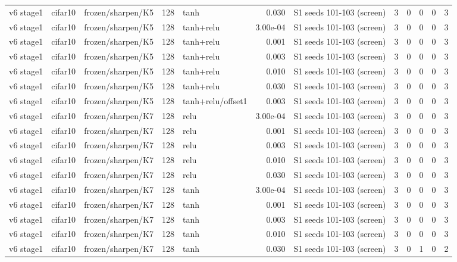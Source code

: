 \begin{table}[htbp]
{\begin{tabular}{@{}lllrlrlrrrrr@{}}
v6 stage1 & cifar10 & frozen/sharpen/K5 & 128 & tanh & 0.030 & S1 seeds 101-103 (screen) & 3 & 0 & 0 & 0 & 3 \\
v6 stage1 & cifar10 & frozen/sharpen/K5 & 128 & tanh+relu & 3.00e-04 & S1 seeds 101-103 (screen) & 3 & 0 & 0 & 0 & 3 \\
v6 stage1 & cifar10 & frozen/sharpen/K5 & 128 & tanh+relu & 0.001 & S1 seeds 101-103 (screen) & 3 & 0 & 0 & 0 & 3 \\
v6 stage1 & cifar10 & frozen/sharpen/K5 & 128 & tanh+relu & 0.003 & S1 seeds 101-103 (screen) & 3 & 0 & 0 & 0 & 3 \\
v6 stage1 & cifar10 & frozen/sharpen/K5 & 128 & tanh+relu & 0.010 & S1 seeds 101-103 (screen) & 3 & 0 & 0 & 0 & 3 \\
v6 stage1 & cifar10 & frozen/sharpen/K5 & 128 & tanh+relu & 0.030 & S1 seeds 101-103 (screen) & 3 & 0 & 0 & 0 & 3 \\
v6 stage1 & cifar10 & frozen/sharpen/K5 & 128 & tanh+relu/offset1 & 0.003 & S1 seeds 101-103 (screen) & 3 & 0 & 0 & 0 & 3 \\
v6 stage1 & cifar10 & frozen/sharpen/K7 & 128 & relu & 3.00e-04 & S1 seeds 101-103 (screen) & 3 & 0 & 0 & 0 & 3 \\
v6 stage1 & cifar10 & frozen/sharpen/K7 & 128 & relu & 0.001 & S1 seeds 101-103 (screen) & 3 & 0 & 0 & 0 & 3 \\
v6 stage1 & cifar10 & frozen/sharpen/K7 & 128 & relu & 0.003 & S1 seeds 101-103 (screen) & 3 & 0 & 0 & 0 & 3 \\
v6 stage1 & cifar10 & frozen/sharpen/K7 & 128 & relu & 0.010 & S1 seeds 101-103 (screen) & 3 & 0 & 0 & 0 & 3 \\
v6 stage1 & cifar10 & frozen/sharpen/K7 & 128 & relu & 0.030 & S1 seeds 101-103 (screen) & 3 & 0 & 0 & 0 & 3 \\
v6 stage1 & cifar10 & frozen/sharpen/K7 & 128 & tanh & 3.00e-04 & S1 seeds 101-103 (screen) & 3 & 0 & 0 & 0 & 3 \\
v6 stage1 & cifar10 & frozen/sharpen/K7 & 128 & tanh & 0.001 & S1 seeds 101-103 (screen) & 3 & 0 & 0 & 0 & 3 \\
v6 stage1 & cifar10 & frozen/sharpen/K7 & 128 & tanh & 0.003 & S1 seeds 101-103 (screen) & 3 & 0 & 0 & 0 & 3 \\
v6 stage1 & cifar10 & frozen/sharpen/K7 & 128 & tanh & 0.010 & S1 seeds 101-103 (screen) & 3 & 0 & 0 & 0 & 3 \\
v6 stage1 & cifar10 & frozen/sharpen/K7 & 128 & tanh & 0.030 & S1 seeds 101-103 (screen) & 3 & 0 & 1 & 0 & 2 \\

\end{tabular}}
\end{table}
